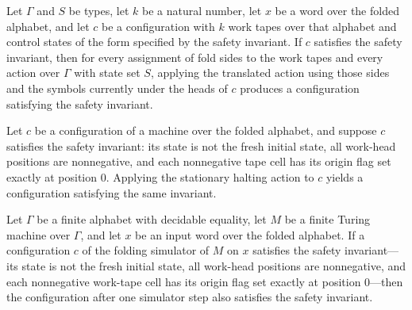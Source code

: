 \begin{lemma}
\label{Turing.FinTM.foldAction_safe}
\leanok
{}
Let $\Gamma$ and $S$ be types, let $k$ be a natural number, let $x$ be a word over the
folded alphabet, and let $c$ be a configuration with $k$ work tapes over that alphabet
and control states of the form specified by the safety invariant. If $c$ satisfies the
safety invariant, then for every assignment of fold sides to the work tapes and every
action over $\Gamma$ with state set $S$, applying the translated action using those
sides and the symbols currently under the heads of $c$ produces a configuration
satisfying the safety invariant.
\end{lemma}

\begin{lemma}
\label{Turing.FinTM.foldHalt_safe}
\leanok
{}
Let $c$ be a configuration of a machine over the folded alphabet, and suppose $c$
satisfies the safety invariant: its state is not the fresh initial state, all work-head
positions are nonnegative, and each nonnegative tape cell has its origin flag set
exactly at position $0$. Applying the stationary halting action to $c$ yields a
configuration satisfying the same invariant.
\end{lemma}

\begin{lemma}
\label{Turing.FinTM.foldSafe_step}
\leanok
{}
Let $\Gamma$ be a finite alphabet with decidable equality, let $M$ be a finite Turing
machine over $\Gamma$, and let $x$ be an input word over the folded alphabet. If a
configuration $c$ of the folding simulator of $M$ on $x$ satisfies the safety
invariant—its state is not the fresh initial state, all work-head positions are
nonnegative, and each nonnegative work-tape cell has its origin flag set exactly at
position $0$—then the configuration after one simulator step also satisfies the safety
invariant.
\end{lemma}


